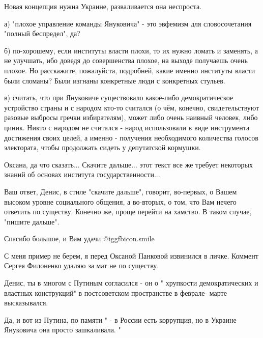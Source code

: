 \begin{itemize}

Новая концепция нужна Украине, разваливается она неспроста.


а) "плохое управление команды Януковича" - это эвфемизм для словосочетания
"полный беспредел", да?

б) по-хорошему, если институты власти плохи, то их нужно ломать и заменять, а
не улучшать, ибо доведя до совершенства плохое, на выходе получаешь очень
плохое. Но расскажите, пожалуйста, подробней, какие именно институты власти
были сломаны? Были изгнаны конкретные люди с конкретных стульев.

в) считать, что при Януковиче существовало какое-либо демократическое
устройство страны и с народом кто-то считался (о чём, конечно, свидетельствуют
разовые выбросы гречки избирателям), может либо очень наивный человек, либо
циник. Никто с народом не считался - народ использовали в виде инструмента
достижения своих целей, а именно - получения необходимого количества голосов
электората, чтобы продолжать сидеть у депутатской кормушки.


Оксана, да что сказать... Скачите дальше... этот текст все же требует некоторых
знаний об основах института государственности...


Ваш ответ, Денис, в стиле "скачите дальше", говорит, во-первых, о Вашем высоком
уровне социального общения, а во-вторых, о том, что Вам нечего ответить по
существу. Конечно же, проще перейти на хамство. В таком случае, "пишите
дальше".


Спасибо большое, и Вам удачи  @igg{fbicon.smile} 


С меня пример не берем, я перед Оксаной Панковой извинился в личке. Коммент
Сергея Филоненко удаляю за мат не по существу.



Денис, ты в многом с Путиным согласился - он о " хрупкости демократических и
властных конструкций" в постсоветском пространстве в феврале- марте
высказывался.


Да, и вот из Путина, по памяти " - в России есть коррупция, но в Украине
Януковича она просто зашкаливала. "


\end{itemize}
